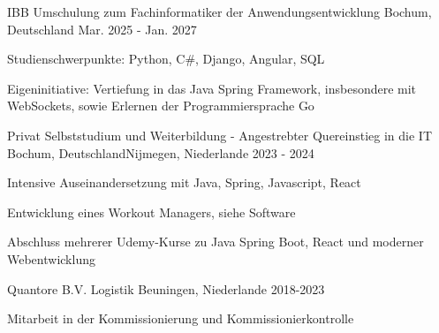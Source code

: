 

\begin{cventries}

  \cventry
  {IBB} %
  {Umschulung zum Fachinformatiker der Anwendungsentwicklung} %
  {Bochum, Deutschland} %
  {Mar. 2025 - Jan. 2027} %
  {
    \begin{cvitems} %
      \item {Studienschwerpunkte: Python, C\#, Django, Angular, SQL}
      \item {Eigeninitiative: Vertiefung in das Java Spring Framework, insbesondere mit WebSockets, sowie Erlernen der Programmiersprache Go}
    \end{cvitems}
  }

  \cventry
  {Privat} %
  {Selbststudium und Weiterbildung - Angestrebter Quereinstieg in die IT} %
  {\newline Bochum, Deutschland\newline Nijmegen, Niederlande} %
  {2023 - 2024} %
  {
    \begin{cvitems} %
      \item {Intensive Auseinandersetzung mit Java, Spring, Javascript, React}
      \item {Entwicklung eines Workout Managers, siehe Software}
      \item {Abschluss mehrerer Udemy-Kurse zu Java Spring Boot, React und moderner Webentwicklung}
    \end{cvitems}
  }

  \cventry
  {Quantore B.V.} %
  {Logistik} %
  {Beuningen, Niederlande} %
  {2018-2023} %
  {
    \begin{cvitems} %
      \item {Mitarbeit in der Kommissionierung und Kommissionierkontrolle}
    \end{cvitems}
  }



\end{cventries}
